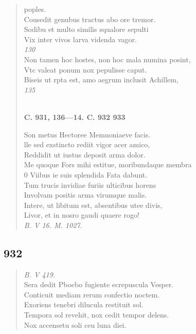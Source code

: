 \documentclass[11pt, a4paper]{report}
\begin{document}
\begin{verse}
poples. \\ Cousedit genubus tractus abo ore tremor. \\ Sodibu et multo similis squalore sepulti \\ Vix inter vivos larva videnda vagor. \\ \textit{130} \\ Non tamen hoc hostes, non hoc mala numina posint, \\ Vtc valeat ponum nox pepulisse caput. \\ Biseis ut rpta est, amo aegrum inclusit Achillem, \\ \textit{135} \\ 
        ﻿\pagebreak 
    \begin{center} \textbf{C. 931, 136—14. C. 932 933} \end{center} \marginpar{[357]} Son metus Hectoree Memnoniaeve facis. \\ lle sed exstincto rediit vigor acer amico, \\ Reddidit ut iustus deposit arma dolor. \\ Me quoque Fors mihi estitue, moribundaque membra \\ 0 Viibus ie suis splendida Fata dabunt. \\ Tum trucis invidiae furiis ulticibus horens \\ Involvam positis arma virumque malis. \\ Intere, ut libitum est, absentibus utee divis, \\ Livor, et in nosro gaudi quaere rogo! \\ \textit{B. V 16. M. 1027.} \\ 
      \end{verse}
  
            \subsection*{932}
      \begin{verse}
      \textit{B. V 419.} \\ Sera dedit Pboebo fugiente ecrepuscula Vesper. \\ Conticuit mediam rerum confectio noctem. \\ Exoriens tenebri dilucula restituit sol. \\ Tempora sol revehit, nox cedit tempor delens. \\ Nox accensetu soli ceu luna diei. \\ 
      \end{verse}
  
\end{document}
